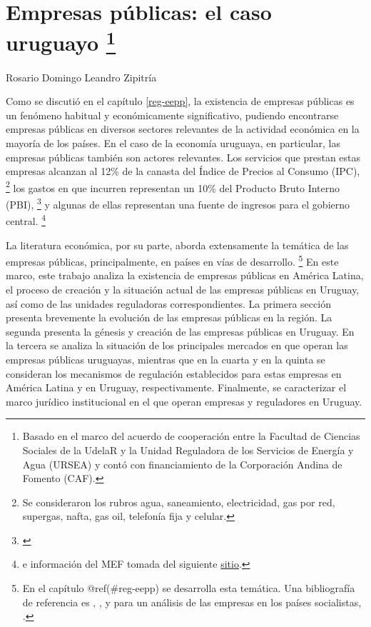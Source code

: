 \documentclass[
  12pt,
  spanish,
]{book}
\begin{document}
\hypertarget{eepp-uy}{%
\chapter[Empresas públicas: el caso uruguayo ]{\texorpdfstring{Empresas públicas: el caso uruguayo \footnote{Basado en el marco del acuerdo de cooperación entre la Facultad de Ciencias Sociales de la UdelaR y la Unidad Reguladora de los Servicios de Energía y Agua (URSEA) y contó con financiamiento de la Corporación Andina de Fomento (CAF).}}{Empresas públicas: el caso uruguayo }}\label{eepp-uy}}

Rosario Domingo
Leandro Zipitría

Como se discutió en el capítulo \ref{reg-eepp}, la existencia de empresas públicas es un fenómeno habitual y económicamente significativo, pudiendo encontrarse empresas públicas en diversos sectores relevantes de la actividad económica en la mayoría de los países. En el caso de la economía uruguaya, en particular, las empresas públicas también son actores relevantes. Los servicios que prestan estas empresas alcanzan al 12\% de la canasta del Índice de Precios al Consumo (IPC),
\footnote{Se consideraron los rubros agua, saneamiento, electricidad, gas por red, supergas, nafta, gas oil, telefonía fija y celular.}
los gastos en que incurren representan un 10\% del Producto Bruto Interno (PBI),
\footnote{\citet{WorldBank2014}}
y algunas de ellas representan una fuente de ingresos para el gobierno central.
\footnote{\citet{WorldBank1995} e información del MEF tomada del siguiente \href{http://www.mef.gub.uy/indicadores.php}{sitio}.}

La literatura económica, por su parte, aborda extensamente la temática de las empresas públicas, principalmente, en países en vías de desarrollo.
\footnote{En el capítulo @ref(\#reg-eepp) se desarrolla esta temática. Una bibliografía de referencia es \citet{Jones1982}, \citet{WorldBank1995}, y para un análisis de las empresas en los países socialistas, \citet{Roland2000}.}
En este marco, este trabajo analiza la existencia de empresas públicas en América Latina, el proceso de creación y la situación actual de las empresas públicas en Uruguay, así como de las unidades reguladoras correspondientes. La primera sección presenta brevemente la evolución de las empresas públicas en la región. La segunda presenta la génesis y creación de las empresas públicas en Uruguay. En la tercera se analiza la situación de los principales mercados en que operan las empresas públicas uruguayas, mientras que en la cuarta y en la quinta se consideran los mecanismos de regulación establecidos para estas empresas en América Latina y en Uruguay, respectivamente. Finalmente, se caracterizar el marco jurídico institucional en el que operan empresas y reguladores en Uruguay.
\end{document}
